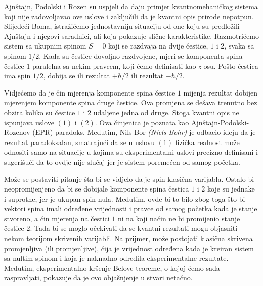 Ajnštajn, Podolski i Rozen su uspjeli da daju primjer kvantnomehaničkog sistema koji
nije zadovoljavao ove uslove i zaključili da je kvantni opis prirode nepotpun.
Slijedeći Boma, istražićemo jednostavniju situaciju od one koju su predložili Ajnštajn
i njegovi saradnici, ali koja pokazuje slične karakteristike. Razmotri\' cemo sistem sa
ukupnim spinom $S = 0$ koji se razdvaja na dvije čestice, $1$ i $2$, svaka sa
spinom $1/2$. Kada su čestice dovoljno razdvojene, mjeri se komponenta spina čestice $1$
paralelna sa nekim pravcem, koji ćemo definisati kao {\it{z}}-osu. Pošto čestica ima spin
$1/2$, dobija se ili rezultat $+\hbar/2$ ili rezultat $-\hbar/2$.

Vidje\' cemo da je čin mjerenja komponente spina čestice $1$ mijenja
rezultat dobijen mjerenjem komponente spina druge čestice. Ova promjena se dešava
trenutno bez obzira koliko su čestice $1$ i $2$ udaljene jedna od druge. Stoga kvantni
opis ne ispunjava uslove $(1)$ i $(2)$. Ova činjenica je poznata kao
Ajnštajn-Podolski-Rozenov (EPR) paradoks. Međutim, Nils Bor {\it{(Niels Bohr)}} je odbacio
ideju da je rezultat paradoksalan, smatrajući da se u uslovu $(1)$ fizička realnost
može odnositi samo na situacije u kojima su eksperimentalni uslovi precizno definisani i sugerišući da to ovdje nije slučaj jer je sistem poremećen od samog početka.

Može se postaviti pitanje šta bi se vidjelo da je spin klasična
varijabla. Ostalo bi neopromijenjeno da bi se dobijale komponente spina čestica $1$ i $2$ koje
su jednake i suprotne, jer je ukupan spin nula. Međutim, ovde bi to bilo zbog toga što bi
vektori spina imali određene vrijednosti i pravce od samog početka kada je stanje stvoreno, a čin mjerenja na čestici $1$ ni na koji način ne bi promijenio stanje čestice
$2$. Tada bi se moglo očekivati da se kvantni rezultati mogu objasniti nekom teorijom skrivenih varijabli. Na prijmer, može postojati klasična skrivena promjenljiva (ili
promjenljive), čija je vrijednost određena kada je kreiran sistem sa nultim spinom i koja je
naknadno odredila eksperimentalne rezultate. Međutim, eksperimentalno kršenje Belove
teoreme, o kojoj ćemo sada raspravljati, pokazuje da je ovo objašnjenje u stvari
netačno.